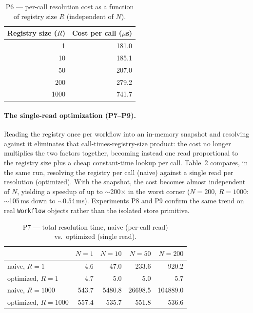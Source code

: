 \begin{table}[htbp]
  \centering
  \caption{P6 --- per-call resolution cost as a function of registry size $R$ (independent of $N$).}
  \label{tab:eval-p6}
  \begin{tabular}{rr}
    \hline
    \textbf{Registry size ($R$)} & \textbf{Cost per call ($\mu$s)} \\
    \hline
    1    & 181.0 \\
    10   & 185.1 \\
    50   & 207.0 \\
    200  & 279.2 \\
    1000 & 741.7 \\
    \hline
  \end{tabular}
\end{table}

\paragraph{The single-read optimization (P7--P9).}
Reading the registry once per workflow into an in-memory snapshot and resolving against it
eliminates that call-times-registry-size product: the cost no longer multiplies the two factors
together, becoming instead one read proportional to the registry size plus a cheap constant-time
lookup per call. Table~\ref{tab:eval-p7} compares, in the same run, resolving
the registry per call (naive) against a single read per resolution (optimized). With the snapshot,
the cost becomes almost independent of $N$, yielding a speedup of up to $\sim$200$\times$ in the
worst corner ($N{=}200$, $R{=}1000$: $\sim$105\,ms down to $\sim$0.54\,ms). Experiments P8 and P9
confirm the same trend on real \texttt{Workflow} objects rather than the isolated store primitive.

\begin{table}[htbp]
  \centering
  \caption{P7 --- total resolution time, naive (per-call read) vs.\ optimized (single read).}
  \label{tab:eval-p7}
  \begin{tabular}{lrrrr}
    \hline
     & $N{=}1$ & $N{=}10$ & $N{=}50$ & $N{=}200$ \\
    \hline
    naive, $R{=}1$       & 4.6   & 47.0   & 233.6   & 920.2    \\
    optimized, $R{=}1$   & 4.7   & 5.0    & 5.0     & 5.7      \\
    naive, $R{=}1000$    & 543.7 & 5480.8 & 26698.5 & 104889.0 \\
    optimized, $R{=}1000$& 557.4 & 535.7  & 551.8   & 536.6    \\
    \hline
  \end{tabular}
\end{table}

